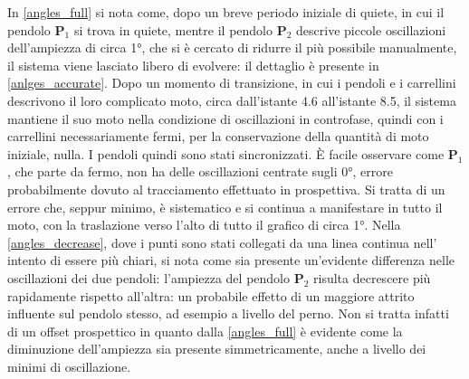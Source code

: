 \documentclass[11pt, a4paper, twoside, italian]{article}
\begin{document}
In \cref{angles_full} si nota come, dopo un breve periodo iniziale di quiete, in cui il
pendolo $\mathbf{P}_1$ si trova in quiete, mentre il pendolo $\mathbf{P}_2$ descrive piccole
oscillazioni dell'ampiezza di circa 1°, che si è cercato di ridurre il più possibile manualmente,
il sistema viene lasciato libero di evolvere: il dettaglio è presente in \cref{anlges_accurate}.
Dopo un momento di transizione, in cui i pendoli e i carrellini descrivono il loro complicato moto,
circa dall'istante 4.6 all'istante 8.5, il sistema mantiene il suo moto nella condizione di
oscillazioni in controfase, quindi con i carrellini necessariamente fermi, per la conservazione
della quantità di moto iniziale, nulla. I pendoli quindi sono stati sincronizzati.
È facile osservare come $\mathbf{P}_1$, che parte da fermo, non ha delle oscillazioni
centrate sugli 0°, errore probabilmente dovuto al tracciamento effettuato in prospettiva.
Si tratta di un errore che, seppur minimo, è sistematico e si continua a manifestare in tutto il moto, 
con la traslazione verso l'alto di tutto il grafico di circa 1°.
Nella \cref{angles_decrease}, dove i punti sono stati collegati da una linea continua nell'
intento di essere più chiari, si nota come sia presente un'evidente differenza nelle oscillazioni 
dei due pendoli: l'ampiezza del pendolo $\mathbf{P}_2$ risulta decrescere più rapidamente rispetto
all'altra: un probabile effetto di un maggiore attrito influente sul pendolo stesso, ad esempio
a livello del perno. Non si tratta infatti di un offset prospettico in quanto dalla \cref{angles_full}
è evidente come la diminuzione dell'ampiezza sia presente simmetricamente, anche a livello dei
minimi di oscillazione.
\end{document}

